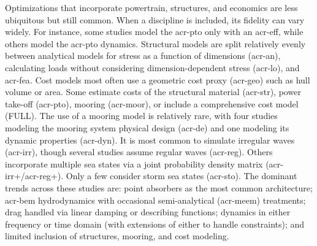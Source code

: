     Optimizations that incorporate powertrain, structures, and economics are less ubiquitous but still common.
    When a discipline is included, its fidelity can vary widely.
    For instance, some studies model the \gls{acr-pto} only with an \acrfull{acr-eff}, while others model the \gls{acr-pto} dynamics.
    Structural models are split relatively evenly between analytical models for stress as a function of dimensions (\acrshort{acr-an}), calculating loads without considering dimension-dependent stress (\acrshort{acr-lo}), and \acrfull{acr-fea}.
    Cost models most often use a geometric cost proxy (\acrshort{acr-geo}) such as hull volume or area.
    Some estimate costs of the structural material (\acrshort{acr-str}), power take-off (\acrshort{acr-pto}), mooring (\acrshort{acr-moor}), or include a comprehensive cost model (FULL).
    The use of a mooring model is relatively rare, with four studies modeling the mooring system physical design (\acrshort{acr-de}) and one modeling its dynamic properties (\acrshort{acr-dyn}).
    It is most common to simulate irregular waves (\acrshort{acr-irr}), though several studies assume regular waves (\acrshort{acr-reg}).
    Others incorporate multiple sea states via a joint probability density matrix (\acrshort{acr-irr}+/\acrshort{acr-reg}+).
    Only a few consider storm sea states (\acrshort{acr-sto}).
\else
    The dominant trends across these studies are: point absorbers as the most common architecture;
    \acrfull{acr-bem} hydrodynamics with occasional semi-analytical (\gls{acr-meem}) treatments;
    drag handled via linear damping or describing functions;
    dynamics in either frequency or time domain (with extensions of either to handle constraints); 
    and limited inclusion of structures, mooring, and cost modeling. 
\fi

\ifdefined\DISSERTATION
